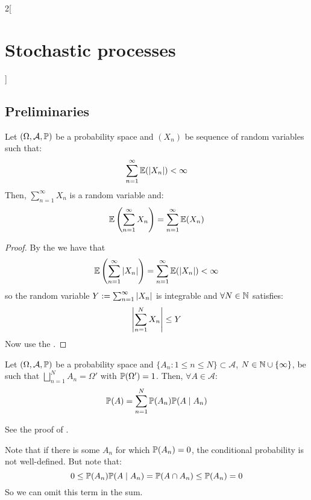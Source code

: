 \documentclass[../../../main_math.tex]{subfiles}
\begin{document}
\begin{multicols}{2}[\section{Stochastic processes}]
  \subsection{Preliminaries}
  \begin{proposition}
    Let $(\Omega,\mathcal{A},\mathbb{P})$ be a probability space and $(X_n)$ be sequence of random variables such that: $$\sum_{n=1}^{\infty}\mathbb{E}(\abs{X_n})<\infty$$
    Then, $\sum_{n=1}^{\infty}X_n$ is a random variable and: $$
      \mathbb{E}\left(\sum_{n=1}^{\infty}X_n\right)=\sum_{n=1}^{\infty}\mathbb{E}(X_n)
    $$
  \end{proposition}
  \begin{proof}
    By the  we have that
    $$\mathbb{E}\left(\sum_{n=1}^{\infty}\abs{X_n}\right)=\sum_{n=1}^{\infty}\mathbb{E}(\abs{X_n})<\infty$$
    so the random variable $Y:=\sum_{n=1}^{\infty}\abs{X_n}$ is integrable and $\forall N\in\mathbb{N}$ satisfies: $$\abs{\sum_{n=1}^{N}X_n}\leq Y$$
    Now use the .
  \end{proof}
  \begin{proposition}
    Let $(\Omega,\mathcal{A},\mathbb{P})$ be a probability space and $\{A_n:1\leq n\leq N\}\subset\mathcal{A}$, $N\in\mathbb{N}\cup\{\infty\}$, be such that $\bigsqcup_{n=1}^N A_n=\Omega'$ with $\mathbb{P}(\Omega')=1$. Then, $\forall A\in\mathcal{A}$: $$\mathbb{P}(A)=\sum_{n=1}^N\mathbb{P}(A_n)\mathbb{P}(A\mid A_n)$$
  \end{proposition}
  \begin{sproof}
    See the proof of .
  \end{sproof}
  \begin{remark}
    Note that if there is some $A_n$ for which $\mathbb{P}(A_n)=0$, the conditional probability is not well-defined. But note that:
    $$0\leq \mathbb{P}(A_n)\mathbb{P}(A\mid A_n)=\mathbb{P}(A\cap A_n)\leq \mathbb{P}(A_n)=0$$
    So we can omit this term in the sum.
  \end{remark}

\end{multicols}
\end{document}
